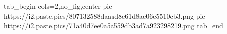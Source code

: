  
 
 
 
 

\ifcmt
  tab_begin cols=2,no_fig,center
     pic https://i2.paste.pics/807132588daaad8e61d8ac06e5510cb3.png
		 pic https://i2.paste.pics/71a40d7ee0a5a559db3ad7a923298219.png
  tab_end
\fi
